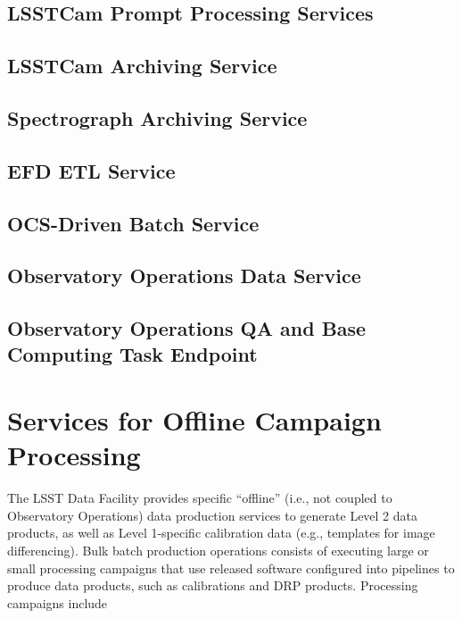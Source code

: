 \subsection{LSSTCam Prompt Processing Services}


\subsection{LSSTCam Archiving Service}


\subsection{Spectrograph Archiving Service}


\subsection{EFD ETL Service}


\subsection{OCS-Driven Batch Service}


\subsection{Observatory Operations Data Service}


\subsection{Observatory Operations QA and Base Computing Task Endpoint}
% 

\section{Services for Offline Campaign Processing}

The LSST Data Facility provides specific “offline” (i.e., not coupled to
Observatory Operations) data production services to generate Level 2 data
products, as well as Level 1-specific calibration data (e.g., templates for
image differencing). Bulk batch production operations consists of executing
large or small processing campaigns that use released software configured into
pipelines to produce data products, such as calibrations and DRP products.
Processing campaigns include

